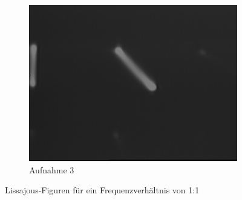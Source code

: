\documentclass[bigchapter,colorback,accentcolor=tud4b,linedtoc,11pt]{tudreport}
\begin{document}
\begin{figure}[H]
\begin{subfigure}[h]{0.32\textwidth}
    \includegraphics[width=\textwidth]{data/Aufgabe7/1-1-180.png}
    \caption[Cap for listoffigures]{Aufnahme 3}
  \end{subfigure}%
  \caption{Lissajous-Figuren für ein Frequenzverhältnis von 1:1}
\end{figure}
\end{document}
